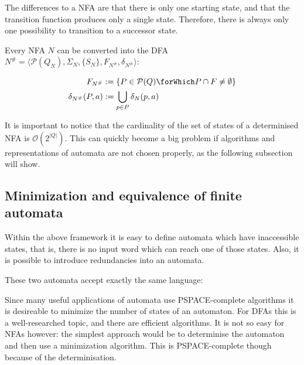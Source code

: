 The differences to a NFA are that there is only one starting state, and that
the transition function produces only a single state.
Therefore, there is always only one possibility to transition to a successor
state.

\begin{definition}
  Every NFA $N$ can be converted into the DFA
  $N^\# = \langle \mathcal{P}(Q_N), \Sigma_N, \{ S_N \}, F_{N^\#}, \delta_{N^\#} \rangle$:

  \begin{align*}
    F_{N^\#} &:= \{ P \in \mathcal{P}(Q) \forWhich P \cap F \neq \emptyset \}\\
    \delta_{N^\#}(P, a) &:= \bigcup_{p \in P} \delta_N(p, a)
  \end{align*}
\end{definition}

It is important to notice that the cardinality of the set of states of a
determinised NFA is $\mathcal{O}(2^{|Q|})$.
This can quickly become a big problem if algorithms and representations of
automata are not chosen properly, as the following subsection will show.

\subsection{Minimization and equivalence of finite automata}

Within the above framework it is easy to define automata which have inaccessible
states, that is, there is no input word which can reach one of those states.
Also, it is possible to introduce redundancies into an automata.

\begin{example}
  These two automata accept exactly the same language:\\
  \center
\end{example}

Since many useful applications of automata use PSPACE-complete algorithms it
is desireable to minimize the number of states of an automaton.
For DFAs this is a well-researched topic, and there are efficient algorithms.
It is not so easy for NFAs however: the simplest approach would be to
determinise the automaton and then use a minimization algorithm.
This is PSPACE-complete though because of the determinisation.

